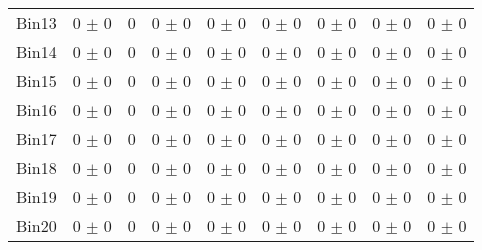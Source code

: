 \begin{tabular}{@{\extracolsep{4pt}}lcccccccc@{}}
     Bin13 & 0 $\pm$ 0 & 0 & 0 $\pm$ 0 & 0 $\pm$ 0 & 0 $\pm$ 0 & 0 $\pm$ 0 & 0 $\pm$ 0 & 0 $\pm$ 0 \\ 
     Bin14 & 0 $\pm$ 0 & 0 & 0 $\pm$ 0 & 0 $\pm$ 0 & 0 $\pm$ 0 & 0 $\pm$ 0 & 0 $\pm$ 0 & 0 $\pm$ 0 \\ 
     Bin15 & 0 $\pm$ 0 & 0 & 0 $\pm$ 0 & 0 $\pm$ 0 & 0 $\pm$ 0 & 0 $\pm$ 0 & 0 $\pm$ 0 & 0 $\pm$ 0 \\ 
     Bin16 & 0 $\pm$ 0 & 0 & 0 $\pm$ 0 & 0 $\pm$ 0 & 0 $\pm$ 0 & 0 $\pm$ 0 & 0 $\pm$ 0 & 0 $\pm$ 0 \\ 
     Bin17 & 0 $\pm$ 0 & 0 & 0 $\pm$ 0 & 0 $\pm$ 0 & 0 $\pm$ 0 & 0 $\pm$ 0 & 0 $\pm$ 0 & 0 $\pm$ 0 \\ 
     Bin18 & 0 $\pm$ 0 & 0 & 0 $\pm$ 0 & 0 $\pm$ 0 & 0 $\pm$ 0 & 0 $\pm$ 0 & 0 $\pm$ 0 & 0 $\pm$ 0 \\ 
     Bin19 & 0 $\pm$ 0 & 0 & 0 $\pm$ 0 & 0 $\pm$ 0 & 0 $\pm$ 0 & 0 $\pm$ 0 & 0 $\pm$ 0 & 0 $\pm$ 0 \\ 
     Bin20 & 0 $\pm$ 0 & 0 & 0 $\pm$ 0 & 0 $\pm$ 0 & 0 $\pm$ 0 & 0 $\pm$ 0 & 0 $\pm$ 0 & 0 $\pm$ 0 \\ 
\hline\hline
  \end{tabular}
